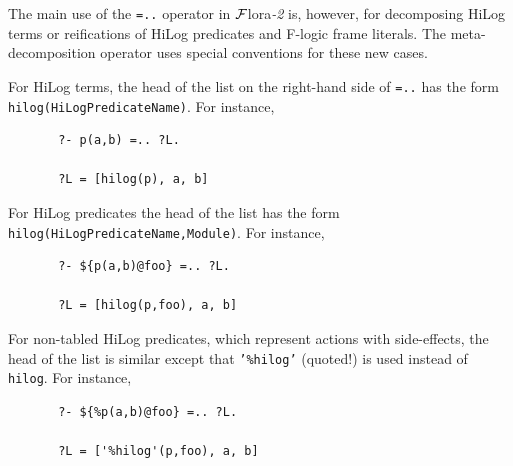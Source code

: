 \documentclass[11pt]{article}
\newcommand{\FLORA}{{\mbox{\sc ${\cal F}${lora}\rm\emph{-2}}}\xspace}
\newcommand{\FLSYSTEM}{\FLORA}
\begin{document}
The main use of the {\tt =..} operator in \FLSYSTEM is, however, for
decomposing HiLog terms or reifications of HiLog predicates and F-logic
frame literals. The meta-decomposition operator uses special
conventions for these new cases.

For HiLog terms, the head of the list on the right-hand side of {\tt =..}
has the form {\tt hilog(HiLogPredicateName)}. For instance, 
\begin{verbatim}
       ?- p(a,b) =.. ?L.
 
       ?L = [hilog(p), a, b]
\end{verbatim}
For HiLog predicates the head of the list has the form {\tt
  hilog(HiLogPredicateName,Module)}. For instance,
\begin{verbatim}
       ?- ${p(a,b)@foo} =.. ?L.
 
       ?L = [hilog(p,foo), a, b]
\end{verbatim}
For non-tabled HiLog predicates, which represent actions with side-effects,
the head of the list is similar except that {\tt '\%hilog'} (quoted!) is 
used instead of {\tt hilog}.  For instance,
\begin{verbatim}
       ?- ${%p(a,b)@foo} =.. ?L.
 
       ?L = ['%hilog'(p,foo), a, b]
\end{verbatim}
\end{document}
